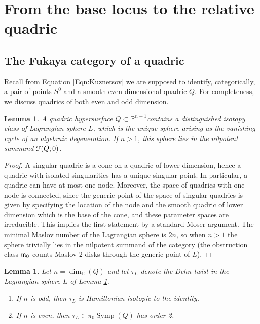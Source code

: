 \documentclass[reqno,10pt]{amsart}
\numberwithin{equation}{section}
\newcommand{\bC}{{\mathbb C}}
\newcommand{\bP}{{\mathbb P}}
\newcommand{\scrF}{\EuScript{F}}
\newcommand{\Symp}{\operatorname{Symp}}
\newtheorem{Lemma}[thm]{Lemma}
\theoremstyle{remark}
\begin{document}




\section{From the base locus to the relative quadric}\label{Sec:BaseToQuadric}

\subsection{The Fukaya category of a quadric\label{Section:Quadric}}

Recall from Equation \ref{Eqn:Kuznetsov} we are supposed to identify, categorically, a pair of points $S^0$ and a smooth even-dimensional quadric $Q$.  For completeness, we discuss quadrics of both even and odd dimension. 

\begin{Lemma} \label{Lem:uniquesphere}
A quadric hypersurface $Q \subset \bP^{n+1}$contains a distinguished isotopy class of Lagrangian sphere $L$, which is the unique sphere arising as the vanishing cycle of an algebraic degeneration. If $n>1$, this sphere  lies in the nilpotent summand $\scrF(Q;0)$.
\end{Lemma}

\begin{proof}
A singular quadric is a cone on a quadric of lower-dimension, hence a quadric with isolated singularities has a unique singular point.  In particular, a quadric can have at most one node. Moreover, the space of quadrics with one node is connected, since the generic point of the space of singular quadrics is given by specifying the location of the node and the smooth quadric of lower dimension which is the base of the cone, and these parameter spaces are irreducible.  This implies the first statement by a standard Moser argument.  The minimal Maslov number of the Lagrangian sphere is $2n$, so when $n>1$ the sphere trivially lies in the nilpotent summand of the category (the obstruction class $\frak{m}_0$ counts Maslov 2 disks through the generic point of $L$).  
 \end{proof}
 
 \begin{Lemma} \label{Lem:QuadricTwist}
 Let $n=\dim_{\bC}(Q)$ and let $\tau_L$ denote the Dehn twist in the Lagrangian sphere $L$ of Lemma \ref{Lem:uniquesphere}. 
 \begin{enumerate}
\item  If $n$ is odd, then $\tau_L$ is Hamiltonian isotopic to the identity.
 \item If $n$ is even, then $\tau_L \in \pi_0\Symp(Q)$ has order 2.
 \end{enumerate}
 \end{Lemma}
 
\end{document}
